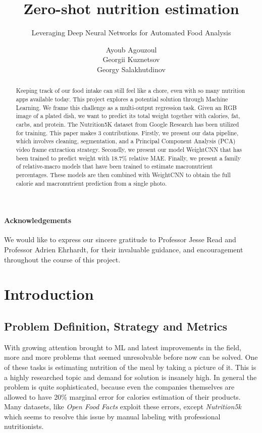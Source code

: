 \documentclass[a4paper]{article}
\author{Ayoub Agouzoul \\ Georgii Kuznetsov \\ Georgy Salakhutdinov}
\title{Zero-shot nutrition estimation}
\subtitle{Leveraging Deep Neural Networks for Automated Food Analysis}
\begin{document}
    \maketitle

    \begin{abstract}
        \noindent Keeping track of our food intake can still feel like a chore, even with so many nutrition apps available today. This project explores a potential solution through Machine Learning. We frame this challenge as a multi-output regression task. Given an RGB image of a plated dish, we want to predict its total weight together with calories, fat, carbs, and protein. The Nutrition5K dataset from Google Research has been utilized for training. This paper makes 3 contributions. Firstly, we present our data pipeline, which involves cleaning, segmentation, and a Principal Component Analysis (PCA) video frame extraction strategy. Secondly, we present our model WeightCNN that has been trained to predict weight with 18.7\% relative MAE. Finally, we present a family of relative-macro models that have been trained to estimate macronutrient percentages. These models are then combined with WeightCNN to obtain the full calorie and macronutrient prediction from a single photo.  
    \end{abstract}	

    \vfill

    \paragraph*{Acknowledgements}
    \noindent We would like to express our sincere gratitude to Professor Jesse Read and Professor Adrien Ehrhardt, for their invaluable guidance, and encouragement throughout the course of this project.

    
    \clearpage
    
    \tableofcontents
    \clearpage
    
	\section{Introduction} 
        \subsection{Problem Definition, Strategy and Metrics}
        \label{sec:metrics}
        With growing attention brought to ML and latest improvements in the field, more and more problems that seemed unresolvable before now can be solved. One of these tasks is estimating nutrition of the meal by taking a picture of it. This is a highly researched topic and demand for solution is insanely high. In general the problem is quite sophisticated, because even the companies themselves are allowed to have 20\% marginal error for calories estimation of their products. Many datasets, like \textit{Open Food Facts} \cite{openfoodfacts} exploit these errors, except \textit{Nutrition5k} \cite{thames2021nutrition5k} which seems to resolve this issue by manual labeling with professional nutritionists.
        
\end{document}
